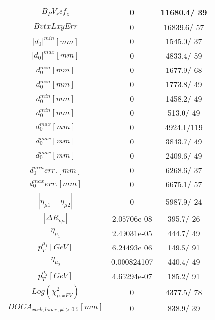 \documentclass{article}
\begin{document}
\begin{table}[htbp]
\begin{center}
\begin{tabular}{c|c|c}
\hline
$B_PV_ref_z$ & 0 & 11680.4/ 39\\
\hline
$BvtxLxyErr$ & 0 & 16839.6/ 57\\
\hline
$|d_{0}|^{min} [mm]$ & 0 & 1545.0/ 37\\
\hline
$|d_{0}|^{max} [mm]$ & 0 & 4833.4/ 59\\
\hline
$d_{0}^{min} [mm]$ & 0 & 1677.9/ 68\\
\hline
$d_{0}^{min} [mm]$ & 0 & 1773.8/ 49\\
\hline
$d_{0}^{min} [mm]$ & 0 & 1458.2/ 49\\
\hline
$d_{0}^{min} [mm]$ & 0 & 513.0/ 49\\
\hline
$d_{0}^{max} [mm]$ & 0 & 4924.1/119\\
\hline
$d_{0}^{max} [mm]$ & 0 & 3843.7/ 49\\
\hline
$d_{0}^{max} [mm]$ & 0 & 2409.6/ 49\\
\hline
$d_{0}^{min} err. [mm]$ & 0 & 6268.6/ 37\\
\hline
$d_{0}^{max} err. [mm]$ & 0 & 6675.1/ 57\\
\hline
$|\eta_{\mu1}-\eta_{\mu2}|$ & 0 & 5987.9/ 24\\
\hline
$|\Delta R_{\mu \mu}|$ & 2.06706e-08 & 395.7/ 26\\
\hline
$\eta_{\mu_{1}}$ & 2.49031e-05 & 444.7/ 49\\
\hline
$p_{T}^{\mu_{1}} [GeV]$ & 6.24493e-06 & 149.5/ 91\\
\hline
$\eta_{\mu_{2}}$ & 0.000824107 & 440.4/ 49\\
\hline
$p_{T}^{\mu_{2}} [GeV]$ & 4.66294e-07 & 185.2/ 91\\
\hline
$Log(\chi^{2}_{\mu,xPV})$ & 0 & 4377.5/ 78\\
\hline
$DOCA_{xtrk, loose, pt>0.5} [mm]$ & 0 & 838.9/ 39\\
\hline
\end{tabular}
\end{center}
\end{table}
\end{document}
